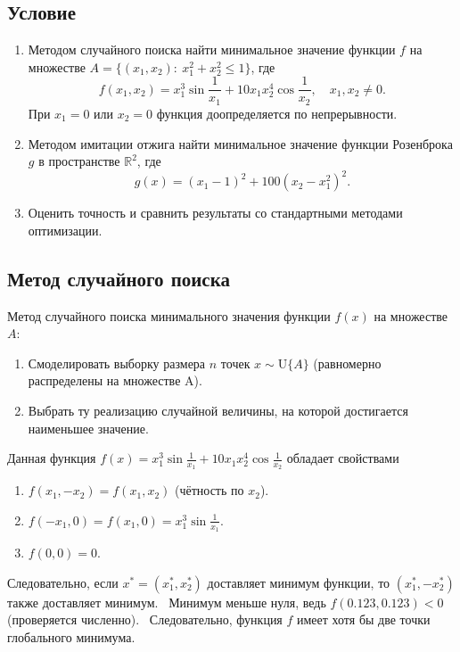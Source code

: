 \documentclass[11pt]{report}
\begin{document}
\subsection{Условие}

\begin{enumerate}
\item Методом случайного поиска найти минимальное значение функции $f$ на множестве $A = \{(x_1,x_2):~x_1^2+x_2^2\leqslant 1\}$, где
$$
f(x_1,x_2) = x_1^3\sin\frac{1}{x_1} + 10x_1x_2^4\cos\frac{1}{x_2},\quad x_1,x_2\neq0.
$$
При $x_1=0$ или $x_2=0$ функция доопределяется по непрерывности.

\item Методом имитации отжига найти минимальное значение функции Розенброка $g$ в пространстве $\mathbb{R}^2$, где
$$
g(x) = (x_1-1)^2 + 100(x_2-x_1^2)^2.
$$

\item Оценить точность и сравнить результаты со стандартными методами оптимизации.
\end{enumerate}

\subsection{Метод случайного поиска}

Метод случайного поиска минимального значения функции $f(x)$ на множестве $A$:
\begin{enumerate}
\item Смоделировать выборку размера $n$ точек $x\sim\mathrm{U}\{A\}$ (равномерно распределены на множестве A).
\item Выбрать ту реализацию случайной величины, на которой достигается наименьшее значение.
\end{enumerate}

Данная функция $f(x)=x_1^3\sin\frac{1}{x_1}+10x_1x_2^4\cos\frac{1}{x_2}$ обладает свойствами
\begin{enumerate}
\item $f(x_1,-x_2)=f(x_1,x_2)$ (чётность по $x_2$).
\item $f(-x_1,0)=f(x_1,0)=x_1^3\sin\frac{1}{x_1}$.
\item $f(0,0)=0$.
\end{enumerate}

Следовательно, если $x^*=(x_1^*,x_2^*)$ доставляет минимум функции, то $(x_1^*,-x_2^*)$ также доставляет минимум. \
Минимум меньше нуля, ведь $f(0.123, 0.123) < 0$ (проверяется численно). \
Следовательно, функция $f$ имеет хотя бы две точки глобального минимума.
\end{document}
